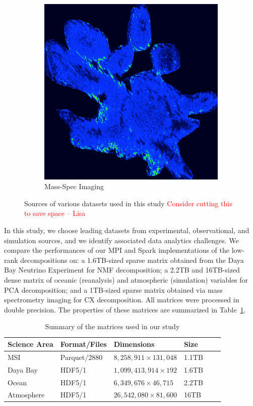 \begin{figure}
\begin{subfigure}[b]{0.22\textwidth}
\includegraphics[width=\textwidth]{fig/mass-spec.png}
\caption{Mass-Spec Imaging}
\label{fig:mass-spec}
\end{subfigure}
\caption{Sources of various datasets used in this study \textcolor{red}{Consider cutting this to save space -- Lisa}}\label{fig:datasets}
\end{figure}
In this study, we choose leading datasets from experimental, observational, and simulation sources, and we identify associated data analytics challenges. 
We compare the performances of our MPI and Spark implementations of the low-rank decompositions on: a 1.6TB-sized sparse matrix obtained from the Daya Bay Neutrino Experiment for NMF decomposition;  a 2.2TB and 16TB-sized dense matrix of oceanic (reanalysis) and atmospheric (simulation) variables for PCA decomposition; and a 1TB-sized sparse matrix obtained via mass spectrometry imaging for  CX decomposition. All matrices were processed in double precision. 
The properties of these matrices are summarized in Table~\ref{table:datasets}.

\begin{table}[ht]
\centering
\caption{Summary of the matrices used in our study}
\label{table:datasets}
\begin{tabular}{p{1.5cm}lllll@{}}
\toprule
Science Area & Format/Files & Dimensions & Size  \\ \midrule
MSI      & Parquet/2880        &  $8,258,911 \times 131,048$          & 1.1TB  \\
Daya Bay & HDF5/1      &   $1,099,413,914 \times 192$         & 1.6TB \\
Ocean              & HDF5/1      &  $6,349,676 \times 46,715$          & 2.2TB \\
Atmosphere           & HDF5/1       & $26,542,080 \times 81,600$           & 16TB \\ \bottomrule
\end{tabular}
\end{table}



